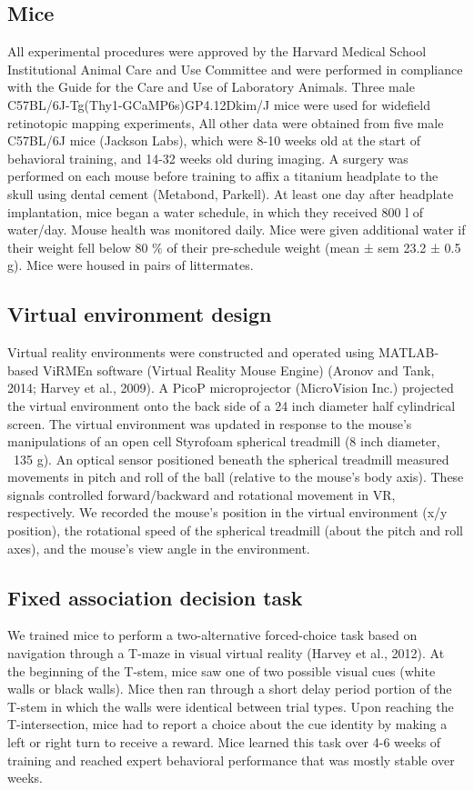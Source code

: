\subsection{Mice}
All experimental procedures were approved by the Harvard Medical School Institutional Animal Care and Use Committee and were performed in compliance with the Guide for the Care and Use of Laboratory Animals. Three male C57BL/6J-Tg(Thy1-GCaMP6s)GP4.12Dkim/J mice were used for widefield retinotopic mapping experiments, All other data were obtained from five male C57BL/6J mice (Jackson Labs), which were 8-10 weeks old at the start of behavioral training, and 14-32 weeks old during imaging. A surgery was performed on each mouse before training to affix a titanium headplate to the skull using dental cement (Metabond, Parkell). At least one day after headplate implantation, mice began a water schedule, in which they received 800 l of water/day. Mouse health was monitored daily. Mice were given additional water if their weight fell below 80 $\%$ of their pre-schedule weight (mean ± sem 23.2 ± 0.5 g). Mice were housed in pairs of littermates.

\subsection{Virtual environment design}
Virtual reality environments were constructed and operated using MATLAB-based ViRMEn software (Virtual Reality Mouse Engine) (Aronov and Tank, 2014; Harvey et al., 2009). A PicoP microprojector (MicroVision Inc.) projected the virtual environment onto the back side of a 24 inch diameter half cylindrical screen. The virtual environment was updated in response to the mouse's manipulations of an open cell Styrofoam spherical treadmill (8 inch diameter, ~135 g). An optical sensor positioned beneath the spherical treadmill measured movements in pitch and roll of the ball (relative to the mouse's body axis). These signals controlled forward/backward and rotational movement in VR, respectively. We recorded the mouse's position in the virtual environment (x/y position), the rotational speed of the spherical treadmill (about the pitch and roll axes), and the mouse's view angle in the environment. 

\subsection{Fixed association decision task}
We trained mice to perform a two-alternative forced-choice task based on navigation through a T-maze in visual virtual reality (Harvey et al., 2012). At the beginning of the T-stem, mice saw one of two possible visual cues (white walls or black walls). Mice then ran through a short delay period portion of the T-stem in which the walls were identical between trial types. Upon reaching the T-intersection, mice had to report a choice about the cue identity by making a left or right turn to receive a reward. Mice learned this task over 4-6 weeks of training and reached expert behavioral performance that was mostly stable over weeks.

